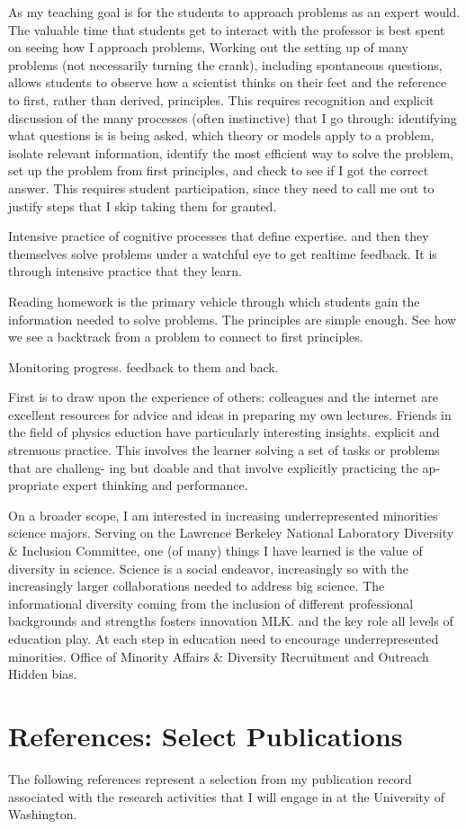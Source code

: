 \documentclass{article}
\begin{document}
As my teaching goal is for the students to approach problems as an expert would.
The valuable time that students get to interact with the professor is best spent on
seeing how I approach problems,
Working out the setting up of many problems (not necessarily turning the crank),
including spontaneous questions, allows students to observe how a scientist thinks on their
feet and the reference to first, rather than derived, principles.
This requires recognition and explicit discussion of the many processes (often instinctive) that I go through:
identifying what questions is is being asked, which theory or models apply to a problem, isolate relevant
information, identify the most efficient way to solve the problem, set up the problem from first principles,
and check to see if I got the correct answer.
This requires student participation, since they need to call me out to justify steps that I skip taking them for granted.

Intensive practice of cognitive processes that define expertise.
 and then they themselves solve problems
under a watchful eye to get realtime feedback. 
It is through intensive practice that they learn.

Reading homework is the primary vehicle through which students gain the information
needed to solve problems.
The principles are simple enough.  See how we see a backtrack from a problem to connect
to first principles.



Monitoring progress.
feedback to them and back.


First is to draw upon the experience of others:
colleagues and the internet are excellent resources for advice and ideas in preparing
my own lectures.  Friends in the field of physics eduction have particularly interesting
insights.  
explicit and strenuous practice.
This involves the learner solving a set of tasks or problems that are challeng- ing but doable and that involve explicitly practicing the ap- propriate expert thinking and performance. 


On a broader scope, I am interested in increasing underrepresented minorities science majors.
Serving on the Lawrence Berkeley National Laboratory Diversity \& Inclusion Committee, one (of many) things I have
learned is the value of diversity in science.  Science is a social endeavor, increasingly so with
the increasingly larger collaborations needed to address big science.  The informational diversity
coming  from the inclusion of different professional backgrounds and strengths fosters innovation
MLK.
 and the key role all levels of education play.  At each step
in education need to encourage underrepresented minorities.
Office of Minority Affairs \& Diversity Recruitment and Outreach
Hidden bias.



\section{References: Select Publications}
The following references represent a selection from my publication record associated with the research
activities that I will engage in at the University of Washington.



\end{document}
